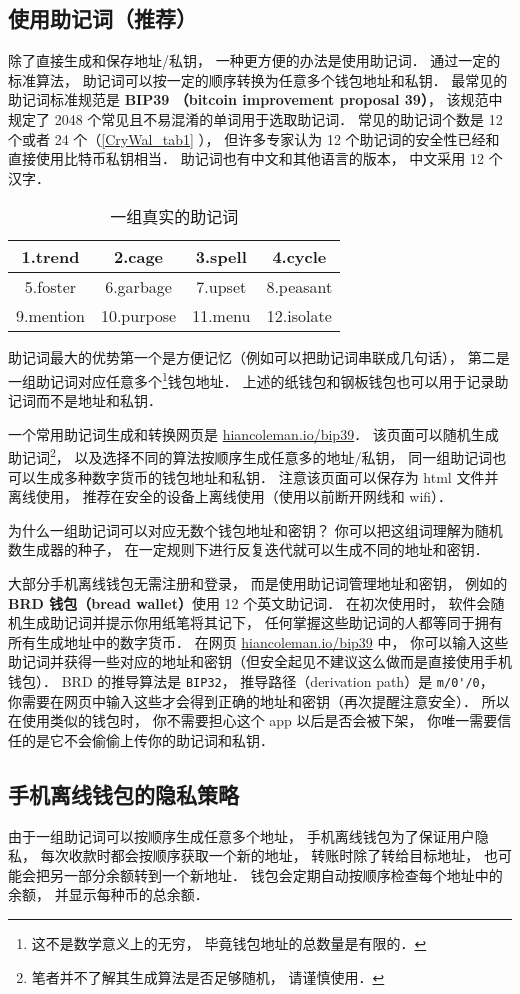 \subsection{使用助记词（推荐）}
除了直接生成和保存地址/私钥， 一种更方便的办法是使用助记词． 通过一定的标准算法， 助记词可以按一定的顺序转换为任意多个钱包地址和私钥． 最常见的助记词标准规范是 \textbf{BIP39 （bitcoin improvement proposal 39）}， 该规范中规定了 2048 个常见且不易混淆的单词用于选取助记词． 常见的助记词个数是 12 个或者 24 个（\autoref{CryWal_tab1} ）， 但许多专家认为 12 个助记词的安全性已经和直接使用比特币私钥相当． 助记词也有中文和其他语言的版本， 中文采用 12 个汉字．
\begin{table}[ht]
\centering
\caption{一组真实的助记词}\label{CryWal_tab1}
\begin{tabular}{|c|c|c|c|}
\hline
1.trend & 2.cage & 3.spell & 4.cycle \\
\hline
5.foster & 6.garbage & 7.upset & 8.peasant \\
\hline
9.mention & 10.purpose & 11.menu & 12.isolate \\
\hline
\end{tabular}
\end{table}

助记词最大的优势第一个是方便记忆（例如可以把助记词串联成几句话）， 第二是一组助记词对应任意多个\footnote{这不是数学意义上的无穷， 毕竟钱包地址的总数量是有限的．}钱包地址． 上述的纸钱包和钢板钱包也可以用于记录助记词而不是地址和私钥．

一个常用助记词生成和转换网页是 \href{https://iancoleman.io/bip39/}{hiancoleman.io/bip39}． 该页面可以随机生成助记词\footnote{笔者并不了解其生成算法是否足够随机， 请谨慎使用．}， 以及选择不同的算法按顺序生成任意多的地址/私钥， 同一组助记词也可以生成多种数字货币的钱包地址和私钥． 注意该页面可以保存为 html 文件并离线使用， 推荐在安全的设备上离线使用（使用以前断开网线和 wifi）．

为什么一组助记词可以对应无数个钱包地址和密钥？ 你可以把这组词理解为随机数生成器的种子， 在一定规则下进行反复迭代就可以生成不同的地址和密钥．

大部分手机离线钱包无需注册和登录， 而是使用助记词管理地址和密钥， 例如的 \textbf{BRD 钱包（bread wallet）}使用 12 个英文助记词． 在初次使用时， 软件会随机生成助记词并提示你用纸笔将其记下， 任何掌握这些助记词的人都等同于拥有所有生成地址中的数字货币． 在网页 \href{https://iancoleman.io/bip39/}{hiancoleman.io/bip39} 中， 你可以输入这些助记词并获得一些对应的地址和密钥（但安全起见不建议这么做而是直接使用手机钱包）． BRD 的推导算法是 \verb|BIP32|， 推导路径（derivation path）是 \verb|m/0'/0|， 你需要在网页中输入这些才会得到正确的地址和密钥（再次提醒注意安全）． 所以在使用类似的钱包时， 你不需要担心这个 app 以后是否会被下架， 你唯一需要信任的是它不会偷偷上传你的助记词和私钥．

\subsection{手机离线钱包的隐私策略}
由于一组助记词可以按顺序生成任意多个地址， 手机离线钱包为了保证用户隐私， 每次收款时都会按顺序获取一个新的地址， 转账时除了转给目标地址， 也可能会把另一部分余额转到一个新地址． 钱包会定期自动按顺序检查每个地址中的余额， 并显示每种币的总余额．
